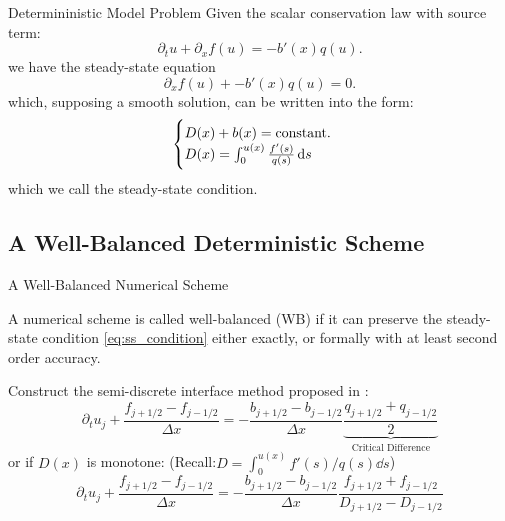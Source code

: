 \documentclass[
    pdf,
    11pt,
    xcolor={svgnames},
  ]{beamer}
\begin{document}
\begin{frame}{Determininistic Model Problem}
    Given the scalar conservation law with source term:
    \begin{equation} \label{eq:model}
        \partial_t u + \partial_x f(u) = -b'(x) q(u).
    \end{equation}
    we have the steady-state equation
    \begin{equation} \label{eq:model_ss}
         \partial_x f(u) + -b'(x) q(u) = 0.
    \end{equation}
    which, supposing a smooth solution, can be written into the form:
    \begin{equation} \label{eq:ss_condition}
        \begin{cases}
            D(x) + b(x) = {\rm constant}. \\
            D(x) = \int_0^{u(x)} \frac{f'(s)}{q(s)} \dd{s}
        \end{cases}
    \end{equation}
    which we call the steady-state condition.
\end{frame}

\subsection{A Well-Balanced Deterministic Scheme}
\begin{frame}{A Well-Balanced Numerical Scheme}
    \begin{definition}
        A numerical scheme is called well-balanced (WB) if it can preserve the steady-state condition \eqref{eq:ss_condition} either exactly, or formally with at least second order accuracy.
    \end{definition}
    \pause
    Construct the semi-discrete interface method proposed in \cite{Jin2001}:
    \begin{equation}
        \partial_t u_j + \frac{f_{j+1/2} - f_{j-1/2}}{\Delta x} = - \frac{b_{j+1/2} - b_{j-1/2}}{\Delta x} 
        \underbrace{\frac{q_{j+1/2} + q_{j-1/2}}{2}}_{\text{Critical Difference}}
    \end{equation}
    \pause
    or if $D(x)$ is monotone: (Recall:$D = \int_0^{u(x)} f'(s)/q(s) \dd{s}$)
    \begin{equation} \label{eq:deterministic_scheme}
        \partial_t u_j + \frac{f_{j+1/2} - f_{j-1/2}}{\Delta x} = - \frac{b_{j+1/2} - b_{j-1/2}}{\Delta x} \frac{f_{j+1/2} + f_{j-1/2}}{D_{j+1/2}-D_{j-1/2}}
    \end{equation}
\end{frame}
\end{document}
